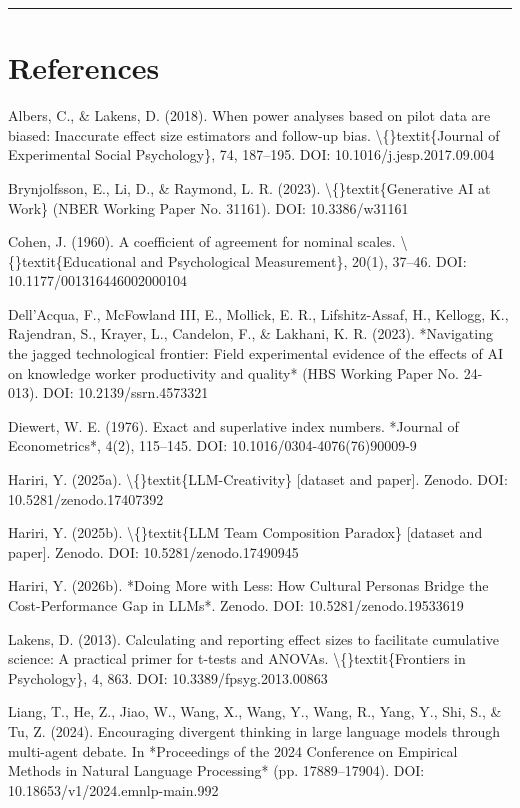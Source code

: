 \documentclass[11pt,a4paper]{article}
\begin{document}
\hrule


\section{References}

Albers, C., \& Lakens, D. (2018). When power analyses based on pilot data
are biased: Inaccurate effect size estimators and follow-up bias.
\textbackslash\{\}textit\{Journal of Experimental Social Psychology\}, 74, 187–195.
DOI: 10.1016/j.jesp.2017.09.004

Brynjolfsson, E., Li, D., \& Raymond, L. R. (2023). \textbackslash\{\}textit\{Generative AI at Work\}
(NBER Working Paper No. 31161). DOI: 10.3386/w31161

Cohen, J. (1960). A coefficient of agreement for nominal scales.
\textbackslash\{\}textit\{Educational and Psychological Measurement\}, 20(1), 37–46.
DOI: 10.1177/001316446002000104

Dell'Acqua, F., McFowland III, E., Mollick, E. R., Lifshitz-Assaf, H.,
Kellogg, K., Rajendran, S., Krayer, L., Candelon, F., \& Lakhani, K. R.
(2023). *Navigating the jagged technological frontier: Field experimental
evidence of the effects of AI on knowledge worker productivity and quality*
(HBS Working Paper No. 24-013). DOI: 10.2139/ssrn.4573321

Diewert, W. E. (1976). Exact and superlative index numbers. *Journal of
Econometrics*, 4(2), 115–145. DOI: 10.1016/0304-4076(76)90009-9

Hariri, Y. (2025a). \textbackslash\{\}textit\{LLM-Creativity\} [dataset and paper]. Zenodo.
DOI: 10.5281/zenodo.17407392

Hariri, Y. (2025b). \textbackslash\{\}textit\{LLM Team Composition Paradox\} [dataset and paper].
Zenodo. DOI: 10.5281/zenodo.17490945

Hariri, Y. (2026b). *Doing More with Less: How Cultural Personas Bridge the
Cost-Performance Gap in LLMs*. Zenodo. DOI: 10.5281/zenodo.19533619

Lakens, D. (2013). Calculating and reporting effect sizes to facilitate
cumulative science: A practical primer for t-tests and ANOVAs.
\textbackslash\{\}textit\{Frontiers in Psychology\}, 4, 863.
DOI: 10.3389/fpsyg.2013.00863

Liang, T., He, Z., Jiao, W., Wang, X., Wang, Y., Wang, R., Yang, Y.,
Shi, S., \& Tu, Z. (2024). Encouraging divergent thinking in large language
models through multi-agent debate. In *Proceedings of the 2024 Conference on
Empirical Methods in Natural Language Processing* (pp. 17889–17904).
DOI: 10.18653/v1/2024.emnlp-main.992
\end{document}
